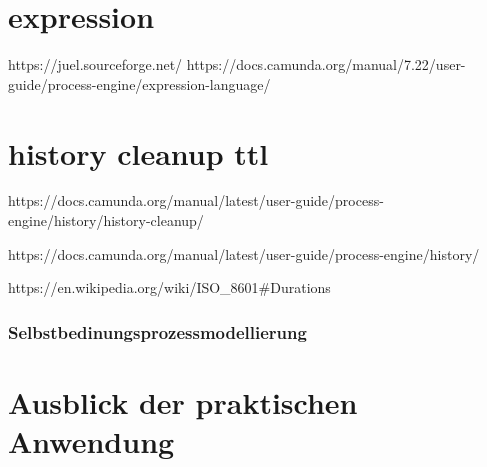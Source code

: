 \section{expression}
https://juel.sourceforge.net/
https://docs.camunda.org/manual/7.22/user-guide/process-engine/expression-language/

\section{history cleanup ttl}
https://docs.camunda.org/manual/latest/user-guide/process-engine/history/history-cleanup/

https://docs.camunda.org/manual/latest/user-guide/process-engine/history/

https://en.wikipedia.org/wiki/ISO_8601#Durations

\subsubsection{Selbstbedinungsprozessmodellierung}


\section{Ausblick der praktischen Anwendung}


 

